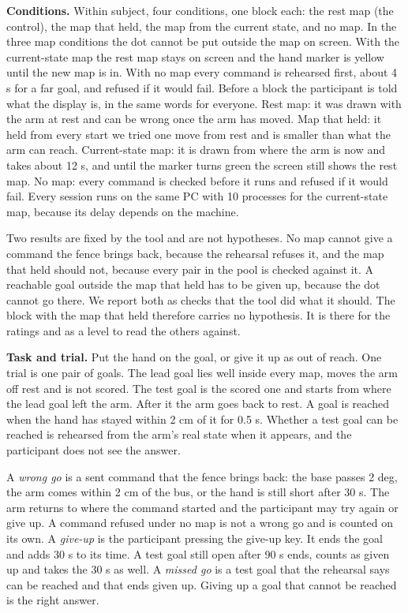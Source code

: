 \documentclass[pdflatex,sn-mathphys-num]{sn-jnl}
\begin{document}
\textbf{Conditions.} Within subject, four conditions, one block each: the rest map (the control), the map that
held, the map from the current state, and no map. In the three map conditions the dot cannot be put outside the
map on screen. With the current-state map the rest map stays on screen and the hand marker is yellow until the
new map is in. With no map every command is rehearsed first, about 4 s for a far goal, and refused if it would
fail. %
Before a block the participant is told what the display is, in the same words for everyone. Rest map: it was
drawn with the arm at rest and can be wrong once the arm has moved. Map that held: it held from every start we
tried one move from rest and is smaller than what the arm can reach. Current-state map: it is drawn from where
the arm is now and takes about 12 s, and until the marker turns green the screen still shows the rest map. No
map: every command is checked before it runs and refused if it would fail. Every session runs on the same PC
with 10 processes for the current-state map, because its delay depends on the machine.

Two results are fixed by the tool and are not hypotheses. No map cannot give a command the fence brings back,
because the rehearsal refuses it, and the map that held should not, because every pair in the pool is checked
against it. A reachable goal outside the map that held has to be given up, because the dot cannot go there. We
report both as checks that the tool did what it should. The block with the map that held therefore carries no
hypothesis. It is there for the ratings and as a level to read the others against.

\textbf{Task and trial.} Put the hand on the goal, or give it up as out of reach. One trial is one pair of goals.
The lead goal lies well inside every map, moves the arm off rest and is not scored. The test goal is the scored
one and starts from where the lead goal left the arm. After it the arm goes back to rest. A goal is reached when
the hand has stayed within 2 cm of it for 0.5 s. Whether a test goal can be reached is rehearsed from the arm's
real state when it appears, and the participant does not see the answer.

A \emph{wrong go} is a sent command that the fence brings back: the base passes 2 deg, the arm comes within 2 cm
of the bus, or the hand is still short after 30 s. The arm returns to where the command started and the
participant may try again or give up. A command refused under no map is not a wrong go and is counted on its own.
A \emph{give-up} is the participant pressing the give-up key. It ends the goal and adds 30 s to its time. A test
goal still open after 90 s ends, counts as given up and takes the 30 s as well. A \emph{missed go} is a test goal
that the rehearsal says can be reached and that ends given up. Giving up a goal that cannot be reached is the
right answer.
\end{document}
